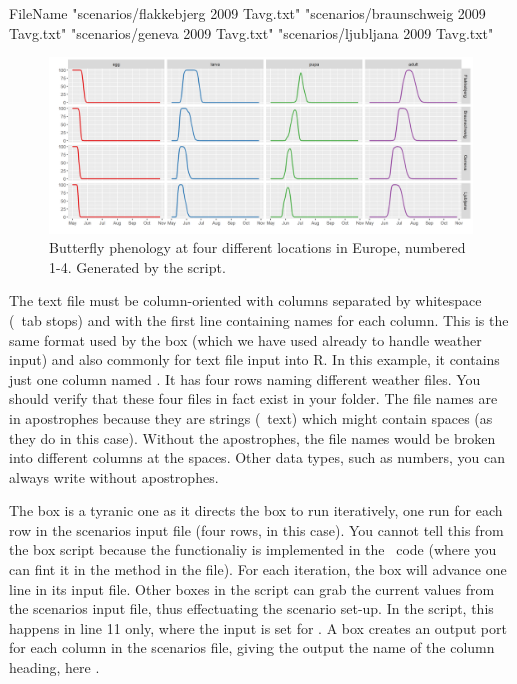 \lstset{numbers=left}
\begin{textfile}
FileName
"scenarios/flakkebjerg 2009 Tavg.txt"
"scenarios/braunschweig 2009 Tavg.txt"
"scenarios/geneva 2009 Tavg.txt"
"scenarios/ljubljana 2009 Tavg.txt"
\end{textfile}
\lstset{numbers=none}

\begin{figure}
\centering
\includegraphics[width=\textwidth]{graphics/scenarios2}
\caption{Butterfly phenology at four different locations in Europe, numbered 1-4. Generated by the  script.}
\label{fig:scenarios1-2}
\end{figure}

The text file must be column-oriented with columns separated by whitespace (\eg\ tab stops) and with the first line containing names for each column. This is the same format used by the  box (which we have used already to handle weather input) and also commonly for text file input into R. In this example, it contains just one column named . It has four rows naming different weather files. You should verify that these four files in fact exist in your  folder. The file names are in apostrophes because they are strings (\ie\ text) which might contain spaces (as they do in this case). Without the apostrophes, the file names would be broken into different columns at the spaces. Other data types, such as numbers, you can always write without apostrophes.

The  box is a tyranic one as it directs the  box to run iteratively, one run for each row in the scenarios input file (four rows, in this case). You cannot tell this from the box script because the functionaliy is implemented in the \CPP\ code (where you can fint it in the  method in the  file). For each iteration, the  box will advance one line in its input file. Other boxes in the script can grab the current values from the scenarios input file, thus effectuating the scenario set-up. In the  script, this happens in line 11 only, where the  input is set for . A  box creates an output port for each column in the scenarios file, giving the output the name of the column heading, here .

